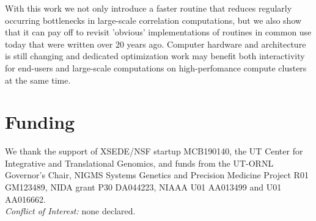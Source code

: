 \documentclass{bioinfo}
\begin{document}
With this work we not only introduce a faster routine that reduces
regularly occurring bottlenecks in large-scale correlation computations, but
we also show that it can pay off to revisit 'obvious' implementations
of routines in common use today that were written over 20 years
ago. Computer hardware and architecture is still changing and
dedicated optimization work may benefit both interactivity for
end-users and large-scale computations on high-perfomance compute
clusters at the same time.

\section*{Funding}

We thank the support of XSEDE/NSF startup MCB190140, the UT Center for
Integrative and Translational Genomics, and funds from the UT-ORNL
Governor's Chair, NIGMS Systems Genetics and Precision Medicine
Project R01 GM123489, NIDA grant P30 DA044223, NIAAA U01 AA013499 and
U01 AA016662.\\
\textit{Conflict of Interest:} none declared.

\vspace*{-5mm}


\end{document}
